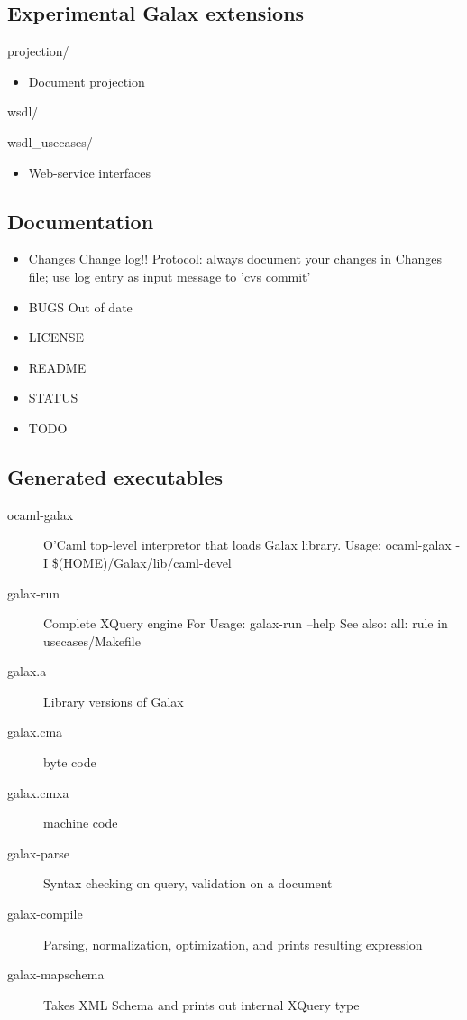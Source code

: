 \subsection{Experimental Galax extensions}

projection/ 
\begin{itemize}
\item   Document projection 
\end{itemize}

wsdl/    

wsdl\_usecases/
\begin{itemize}
\item   Web-service interfaces
\end{itemize}

\subsection{Documentation}
\begin{itemize}
\item Changes     
  Change log!! 
  Protocol: always document your changes in Changes file; use log
    entry as input message to 'cvs commit'

\item BUGS	    
  Out of date

\item LICENSE	 
\item README	 
\item STATUS	    
\item TODO	    
\end{itemize}


\subsection{Generated executables}
\begin{description}
\item[ocaml-galax] O'Caml top-level interpretor that loads Galax library.
               Usage:
               ocaml-galax -I \$(HOME)/Galax/lib/caml-devel

\item[galax-run] Complete XQuery engine
               For Usage:
               galax-run --help
               See also: 
               all: rule in usecases/Makefile

\item[galax.a]       Library versions of Galax
\item[galax.cma]     byte code
\item[galax.cmxa]    machine code

\item[galax-parse]   Syntax checking on query, validation on a document
\item[galax-compile] Parsing, normalization, optimization, and prints resulting expression

\item[galax-mapschema] Takes XML Schema and prints out internal XQuery type
\end{description}

